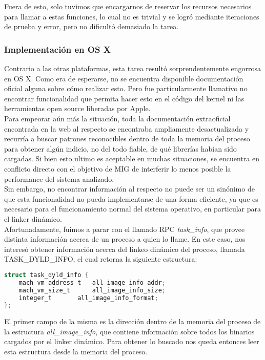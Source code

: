 Fuera de esto, solo tuvimos que encargarnos de reservar los recursos necesarios
para llamar a estas funciones, lo cual no es trivial y se logró mediante
iteraciones de prueba y error, pero no dificultó demasiado la tarea.\\

\subsubsection{Implementación en OS X}

Contrario a las otras plataformas, esta tarea resultó sorprendentemente
engorrosa en OS X. Como era de esperarse, no se encuentra disponible
documentación oficial alguna sobre cómo realizar esto. Pero fue particularmente
llamativo no encontrar funcionalidad que permita hacer esto en el código del
kernel ni las herramientas open source liberadas por Apple.\\

Para empeorar aún más la situación, toda la documentación extraoficial
encontrada en la web al respecto se encontraba ampliamente desactualizada y
recurría a buscar patrones reconocibles dentro de toda la memoria del proceso
para obtener algún indicio, no del todo fiable, de qué librerías habían sido
cargadas. Si bien esto ultimo es aceptable en muchas situaciones, se encuentra
en conflicto directo con el objetivo de MIG de interferir lo menos posible la
performance del sistema analizado.\\

Sin embargo, no encontrar información al respecto no puede ser un sinónimo de
que esta funcionalidad no pueda implementarse de una forma eficiente, ya que es
necesario para el funcionamiento normal del sistema operativo, en particular
para el linker dinámico.\\

Afortunadamente, fuimos a parar con el llamado RPC \textit{task\_info}, que
provee distinta información acerca de un proceso a quien lo llame. En este
caso, nos interesó obtener información acerca del linkeo dinámico del proceso,
llamada TASK\_DYLD\_INFO, el cual retorna la siguiente estructura:

\begin{lstlisting}[language=C]
struct task_dyld_info {
	mach_vm_address_t	all_image_info_addr;
	mach_vm_size_t		all_image_info_size;
	integer_t 		all_image_info_format;
};
\end{lstlisting}

\noindent El primer campo de la misma es la dirección dentro de la memoria del
proceso de la estructura \textit{all\_image\_info}, que contiene información
sobre todos los binarios cargados por el linker dinámico. Para obtener lo
buscado nos queda entonces leer esta estructura desde la memoria del proceso.\\

